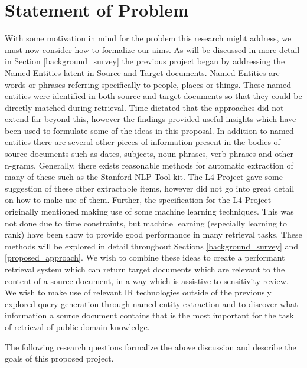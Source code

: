 \documentclass{mprop}
\begin{document}
\section{Statement of Problem}\label{problem_statement}
With some motivation in mind for the problem this research might address, we must now consider how to formalize our aims. As will be discussed in more detail in Section \ref{background_survey} the previous project began by addressing the Named Entities latent in Source and Target documents. Named Entities are words or phrases referring specifically to people, places or things. These named entities were identified in both source and target documents so that they could be directly matched during retrieval. Time dictated that the approaches did not extend far beyond this, however the findings provided useful insights which have been used to formulate some of the ideas in this proposal. In addition to named entities there are several other pieces of information present in the bodies of source documents such as dates, subjects, noun phrases, verb phrases and other n-grams. Generally, there exists reasonable methods for automatic extraction of many of these such as the Stanford NLP Tool-kit. The L4 Project gave some suggestion of these other extractable items, however did not go into great detail on how to make use of them. Further, the specification for the L4 Project originally mentioned making use of some machine learning techniques. This was not done due to time constraints, but machine learning (especially learning to rank) have been show to provide good performance in many retrieval tasks. These methods will be explored in detail throughout Sections \ref{background_survey} and \ref{proposed_approach}. We wish to combine these ideas to create a performant retrieval system which can return target documents which are relevant to the content of a source document, in a way which is assistive to sensitivity review. We wish to make use of relevant IR technologies outside of the previously explored query generation through named entity extraction and to discover what information a source document contains that is the most important for the task of retrieval of public domain knowledge.

The following research questions formalize the above discussion and describe the goals of this proposed project.
\end{document}
